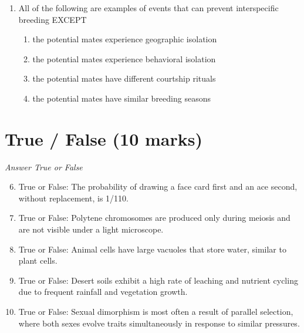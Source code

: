 \documentclass[12pt]{article}
\begin{document}
\begin{enumerate}[label=\arabic*.]
\begin{enumerate}[label=(\alph*)]
    \item Enzymatic reactions with oxygen
    \item Lactose crystallization
    \item Loss of refrigeration power over time
    \item mesophiles
    \item Natural separation of milk components without bacterial influence
\end{enumerate}
\item All of the following are examples of events that can prevent interspecific breeding EXCEPT
\begin{enumerate}[label=(\alph*)]
    \item the potential mates experience geographic isolation
    \item the potential mates experience behavioral isolation
    \item the potential mates have different courtship rituals
    \item the potential mates have similar breeding seasons
\end{enumerate}
\end{enumerate}

\section*{True / False (10 marks)}
\textit{Answer True or False}
\begin{enumerate}[label=\arabic*.]
\setcounter{enumi}{5}
\item True or False: The probability of drawing a face card first and an ace second, without replacement, is 1/110.
\item True or False: Polytene chromosomes are produced only during meiosis and are not visible under a light microscope.
\item True or False: Animal cells have large vacuoles that store water, similar to plant cells.
\item True or False: Desert soils exhibit a high rate of leaching and nutrient cycling due to frequent rainfall and vegetation growth.
\item True or False: Sexual dimorphism is most often a result of parallel selection, where both sexes evolve traits simultaneously in response to similar pressures.
\end{enumerate}
\end{document}
